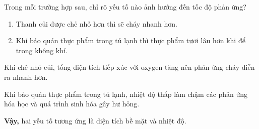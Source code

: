 \begin{tuluyen}
Trong mỗi trường hợp sau, chỉ rõ yếu tố nào ảnh hưởng đến tốc độ phản ứng?
\begin{enumerate}
\item Thanh củi được chẻ nhỏ hơn thì sẽ cháy nhanh hơn.
\item Khi bảo quản thực phẩm trong tủ lạnh thì thực phẩm tươi lâu hơn khi để trong không khí.
\end{enumerate}
\begin{loigiaiBT}
Khi chẻ nhỏ củi, tổng diện tích tiếp xúc với oxygen tăng nên phản ứng cháy diễn ra nhanh hơn.

Khi bảo quản thực phẩm trong tủ lạnh, nhiệt độ thấp làm chậm các phản ứng hóa học và quá trình sinh hóa gây hư hỏng.

\textbf{Vậy,} hai yếu tố tương ứng là diện tích bề mặt và nhiệt độ.
\end{loigiaiBT}
\end{tuluyen}

